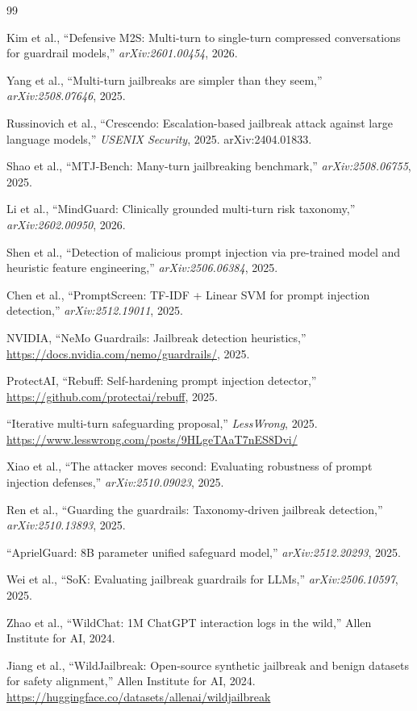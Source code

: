 \documentclass[11pt,a4paper]{article}
\begin{document}
\begin{thebibliography}{99}

Kim et al.,
``Defensive M2S: Multi-turn to single-turn compressed conversations for guardrail models,''
\emph{arXiv:2601.00454}, 2026.

Yang et al.,
``Multi-turn jailbreaks are simpler than they seem,''
\emph{arXiv:2508.07646}, 2025.

Russinovich et al.,
``Crescendo: Escalation-based jailbreak attack against large language models,''
\emph{USENIX Security}, 2025.
arXiv:2404.01833.

Shao et al.,
``MTJ-Bench: Many-turn jailbreaking benchmark,''
\emph{arXiv:2508.06755}, 2025.

Li et al.,
``MindGuard: Clinically grounded multi-turn risk taxonomy,''
\emph{arXiv:2602.00950}, 2026.

Shen et al.,
``Detection of malicious prompt injection via pre-trained model and heuristic feature engineering,''
\emph{arXiv:2506.06384}, 2025.

Chen et al.,
``PromptScreen: TF-IDF + Linear SVM for prompt injection detection,''
\emph{arXiv:2512.19011}, 2025.

NVIDIA,
``NeMo Guardrails: Jailbreak detection heuristics,''
\url{https://docs.nvidia.com/nemo/guardrails/}, 2025.

ProtectAI,
``Rebuff: Self-hardening prompt injection detector,''
\url{https://github.com/protectai/rebuff}, 2025.

``Iterative multi-turn safeguarding proposal,''
\emph{LessWrong}, 2025.
\url{https://www.lesswrong.com/posts/9HLgeTAaT7nES8Dvi/}

Xiao et al.,
``The attacker moves second: Evaluating robustness of prompt injection defenses,''
\emph{arXiv:2510.09023}, 2025.

Ren et al.,
``Guarding the guardrails: Taxonomy-driven jailbreak detection,''
\emph{arXiv:2510.13893}, 2025.

``AprielGuard: 8B parameter unified safeguard model,''
\emph{arXiv:2512.20293}, 2025.

Wei et al.,
``SoK: Evaluating jailbreak guardrails for LLMs,''
\emph{arXiv:2506.10597}, 2025.

Zhao et al.,
``WildChat: 1M ChatGPT interaction logs in the wild,''
Allen Institute for AI, 2024.

Jiang et al.,
``WildJailbreak: Open-source synthetic jailbreak and benign datasets for safety alignment,''
Allen Institute for AI, 2024.
\url{https://huggingface.co/datasets/allenai/wildjailbreak}

\end{thebibliography}
\end{document}
